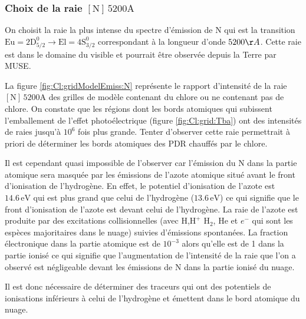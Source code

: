 \subsubsection{Choix de la raie $[\mathrm{N}]\,5200 \mathrm{A}$}

On choisit la raie la plus intense du spectre d'émission de $\mathrm{N}$ qui est la transition $\mathrm{Eu}=2\mathrm{D}^\mathrm{0}_{5/2} \rightarrow \mathrm{El}=4\mathrm{S}^\mathrm{0}_{3/2}$ correspondant à la longueur d'onde $5200 \AA$. Cette raie est dans le domaine du visible et pourrait être observée depuis la Terre par MUSE. \newline 

La figure \ref{fig:Cl:gridModelEmiss:N} représente le rapport d'intensité de la raie $[\mathrm{N}]\,5200 \mathrm{A}$ des grilles de modèle contenant du chlore ou ne contenant pas de chlore. On constate que les régions dont les bords atomiques qui subissent l'emballement de l'effet photoélectrique (figure \ref{fig:Cl:grid:Tba}) ont des intensités de raies jusqu'à $10^6$ fois plus grande. Tenter d'observer cette raie permettrait à priori de déterminer les bords atomiques des PDR chauffés par le chlore. \newline 

Il est cependant quasi impossible de l'observer car l'émission du $\mathrm{N}$ dans la partie atomique sera masquée par les émissions de l'azote atomique situé avant le front d'ionisation de l'hydrogène. En effet, le potentiel d'ionisation de l'azote est $14.6\,\mathrm{eV}$ qui est plus grand que celui de l'hydrogène ($13.6\,\mathrm{eV}$) ce qui signifie que le front d'ionisation de l'azote est devant celui de l'hydrogène. La raie de l'azote est produite par des excitations collisionnelles (avec $\mathrm{H}$,$\mathrm{H}^+$ $\mathrm{H}_2$, $\mathrm{He}$ et $e^-$ qui sont les espèces majoritaires dans le nuage) suivies d'émissions spontanées. La fraction électronique dans la partie atomique est de $10^{-3}$ alors qu'elle est de 1 dans la partie ionisé ce qui signifie que l'augmentation de l'intensité de la raie que l'on a observé est négligeable devant les émissions de $\mathrm{N}$ dans la partie ionisé du nuage.\newline

Il est donc nécessaire de déterminer des traceurs qui ont des potentiels de ionisations inférieurs à celui de l'hydrogène et émettent dans le bord atomique du nuage. 

